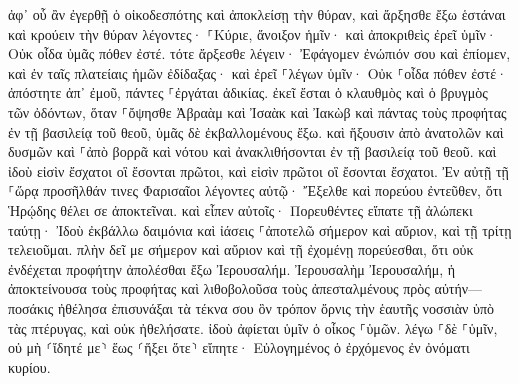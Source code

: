 \documentclass[twoside, 9pt]{extreport}
\begin{document}
ἀφ᾽ οὗ ἂν ἐγερθῇ ὁ οἰκοδεσπότης καὶ ἀποκλείσῃ τὴν θύραν, καὶ ἄρξησθε ἔξω ἑστάναι καὶ κρούειν τὴν θύραν λέγοντες· ⸀Κύριε, ἄνοιξον ἡμῖν· καὶ ἀποκριθεὶς ἐρεῖ ὑμῖν· Οὐκ οἶδα ὑμᾶς πόθεν ἐστέ. 
τότε ἄρξεσθε λέγειν· Ἐφάγομεν ἐνώπιόν σου καὶ ἐπίομεν, καὶ ἐν ταῖς πλατείαις ἡμῶν ἐδίδαξας· 
καὶ ἐρεῖ ⸀λέγων ὑμῖν· Οὐκ ⸀οἶδα πόθεν ἐστέ· ἀπόστητε ἀπ᾽ ἐμοῦ, πάντες ⸀ἐργάται ἀδικίας. 
ἐκεῖ ἔσται ὁ κλαυθμὸς καὶ ὁ βρυγμὸς τῶν ὀδόντων, ὅταν ⸀ὄψησθε Ἀβραὰμ καὶ Ἰσαὰκ καὶ Ἰακὼβ καὶ πάντας τοὺς προφήτας ἐν τῇ βασιλείᾳ τοῦ θεοῦ, ὑμᾶς δὲ ἐκβαλλομένους ἔξω. 
καὶ ἥξουσιν ἀπὸ ἀνατολῶν καὶ δυσμῶν καὶ ⸀ἀπὸ βορρᾶ καὶ νότου καὶ ἀνακλιθήσονται ἐν τῇ βασιλείᾳ τοῦ θεοῦ. 
καὶ ἰδοὺ εἰσὶν ἔσχατοι οἳ ἔσονται πρῶτοι, καὶ εἰσὶν πρῶτοι οἳ ἔσονται ἔσχατοι. 
Ἐν αὐτῇ τῇ ⸀ὥρᾳ προσῆλθάν τινες Φαρισαῖοι λέγοντες αὐτῷ· Ἔξελθε καὶ πορεύου ἐντεῦθεν, ὅτι Ἡρῴδης θέλει σε ἀποκτεῖναι. 
καὶ εἶπεν αὐτοῖς· Πορευθέντες εἴπατε τῇ ἀλώπεκι ταύτῃ· Ἰδοὺ ἐκβάλλω δαιμόνια καὶ ἰάσεις ⸀ἀποτελῶ σήμερον καὶ αὔριον, καὶ τῇ τρίτῃ τελειοῦμαι. 
πλὴν δεῖ με σήμερον καὶ αὔριον καὶ τῇ ἐχομένῃ πορεύεσθαι, ὅτι οὐκ ἐνδέχεται προφήτην ἀπολέσθαι ἔξω Ἰερουσαλήμ. 
Ἰερουσαλὴμ Ἰερουσαλήμ, ἡ ἀποκτείνουσα τοὺς προφήτας καὶ λιθοβολοῦσα τοὺς ἀπεσταλμένους πρὸς αὐτήν—ποσάκις ἠθέλησα ἐπισυνάξαι τὰ τέκνα σου ὃν τρόπον ὄρνις τὴν ἑαυτῆς νοσσιὰν ὑπὸ τὰς πτέρυγας, καὶ οὐκ ἠθελήσατε. 
ἰδοὺ ἀφίεται ὑμῖν ὁ οἶκος ⸀ὑμῶν. λέγω ⸀δὲ ⸀ὑμῖν, οὐ μὴ ⸂ἴδητέ με⸃ ἕως ⸂ἥξει ὅτε⸃ εἴπητε· Εὐλογημένος ὁ ἐρχόμενος ἐν ὀνόματι κυρίου. 
\end{document}
